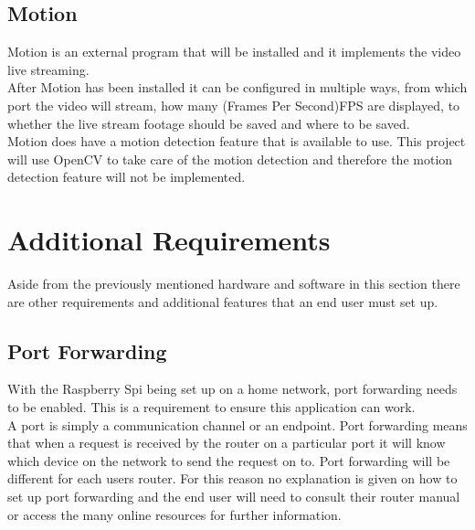 \documentclass[12pt]{report}
\begin{document}
\noindent
\subsection{Motion}
\label{subsec:motion}
Motion is an external program that will be installed and it implements the video live streaming.\\

After Motion has been installed it can be configured in multiple ways, from which port the video will stream, how many (Frames Per Second)FPS are displayed, to whether the live stream footage should be saved and where to be saved.\\

Motion does have a motion detection feature that is available to use. This project will use OpenCV to take care of the motion detection and therefore the motion detection feature will not be implemented.\\

\clearpage
\section{Additional Requirements}	
\label{sec:additional}
Aside from the previously mentioned hardware and software in this section there are other requirements and additional features that an end user must set up.\\

\noindent
\subsection{Port Forwarding}
\label{subsec:portfwd}
With the Raspberry Spi being set up on a home network, port forwarding needs to be enabled. This is a requirement to ensure this application can work.\\

A port is simply a communication channel or an endpoint. Port forwarding means that when a request is received by the router on a particular port it will know which device on the network to send the request on to. Port forwarding will be different for each users router. For this reason no explanation is given on how to set up port forwarding and the end user will need to consult their router manual or access the many online resources for further information.\\
\end{document}
